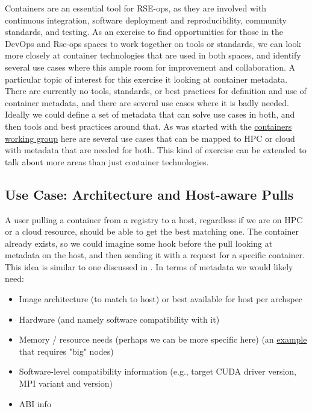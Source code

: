 Containers are an essential tool for RSE-ops, as they are involved with continuous integration, software deployment and reproducibility,
community standards, and testing. As an exercise to find opportunities for those in the DevOps and Rse-ops spaces to work together on tools or standards, we
can look more closely at container technologies that are used in both spaces, and identify several use cases
where this ample room for improvement and collaboration.
A particular topic of interest for this exercise it looking at container metadata.
There are currently no tools, standards, or best practices for definition and use of container metadata,
and there are several use cases where it is badly needed.
Ideally we could define a set of metadata that can solve use cases in both, and then tools and best practices around that. As was started with the \href{https://supercontainers.github.io/containers-wg}{containers working group} here are several use cases that can be mapped to HPC or cloud with metadata that are needed for both. This kind of exercise can be extended to talk about more areas than just container technologies.

\subsection{Use Case: Architecture and Host-aware Pulls}
A user pulling a container from a registry to a host, regardless if we are on HPC or a cloud resource, should be able to get the best matching one. The container already exists, so we could imagine some hook before the pull looking at metadata on the host, and then sending it with a request for a specific container. This idea is similar to one discussed in \cite{Younge2019-uk}. In terms of metadata we would likely need:

\begin{itemize}
\item Image architecture (to match to host) or best available for host per archspec
\item Hardware (and namely software compatibility with it)
\item Memory / resource needs (perhaps we can be more specific here) (an \href{https://github.com/spack/spack/blob/develop/share/spack/gitlab/cloud\_pipelines/stacks/e4s/spack.yaml\#L347-L364}{example} that requires "big" nodes)
\item Software-level compatibility information (e.g., target CUDA driver version, MPI variant and version)
\item ABI info
\end{itemize}

